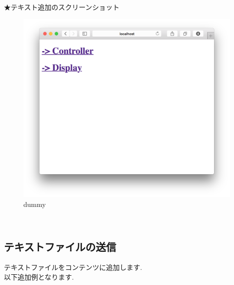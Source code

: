 \documentclass[a4paper,10pt,oneside]{jsbook}
\begin{document}
★テキスト追加のスクリーンショット
\begin{figure}[htbp]
	\begin{center}
		\includegraphics[width=11.5cm]{image/home.png}
	\end{center}
	\caption{dummy}
	\label{fig:home}
\end{figure}
\\


\subsection{テキストファイルの送信}
テキストファイルをコンテンツに追加します.\\
以下追加例となります.\\
\end{document}
